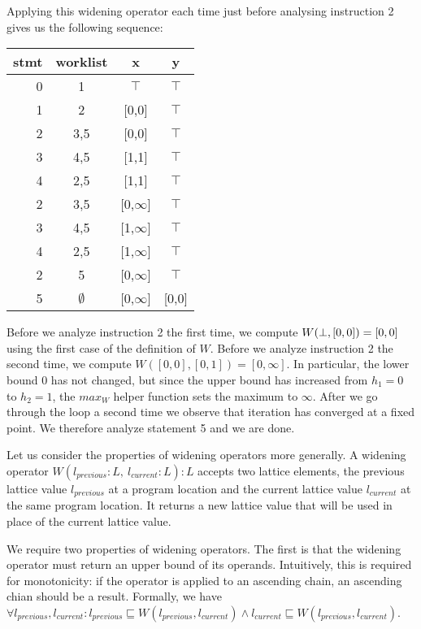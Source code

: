 \documentclass[11pt]{article}
\def\tablespace{\vspace{2ex}}
\newcommand{\alap}{\sqsubseteq}
\begin{document}
\begin{sloppypar}
Applying this widening operator each time just before analysing instruction 2 gives us the following sequence:

\tablespace
\begin{tabular}{r | c | c c}

stmt & worklist & x & y \\
\hline
0  & 1   & $\top$ & $\top$ \\
1  & 2   & [0,0] & $\top$ \\
2  & 3,5 & [0,0] & $\top$ \\
3  & 4,5 & [1,1] & $\top$ \\
4  & 2,5 & [1,1] & $\top$ \\
2  & 3,5 & [0,$\infty$] & $\top$ \\
3  & 4,5 & [1,$\infty$] & $\top$ \\
4  & 2,5 & [1,$\infty$] & $\top$ \\
2  & 5 & [0,$\infty$] & $\top$ \\
5  & $\emptyset$ & [0,$\infty$] & [0,0] \\
\end{tabular}
\tablespace

Before we analyze instruction 2 the first time, we compute $W(\bot, [0,0]) = [0,0]$ using the first case of the definition of $W$.  Before we analyze instruction 2 the second time, we compute $W([0,0], [0,1]) = [0,\infty]$.  In particular, the lower bound $0$ has not changed, but since the upper bound has increased from $h_1=0$ to $h_2=1$, the $max_W$ helper function sets the maximum to $\infty$.  After we go through the loop a second time we observe that iteration has converged at a fixed point.  We therefore analyze statement 5 and we are done.

Let us consider the properties of widening operators more generally.  A widening operator $W(l_\textit{previous} {:} L,~ l_\textit{current} {:} L) : L$ accepts two lattice elements, the previous lattice value $l_\textit{previous}$ at a program location and the current lattice value $l_\textit{current}$ at the same program location.  It returns a new lattice value that will be used in place of the current lattice value.

We require two properties of widening operators.  The first is that the widening operator must return an upper bound of its operands.  Intuitively, this is required for monotonicity: if the operator is applied to an ascending chain, an ascending chian should be a result.  Formally, we have $\forall l_\textit{previous}, l_\textit{current} : l_\textit{previous} \alap W(l_\textit{previous}, l_\textit{current}) \land l_\textit{current} \alap W(l_\textit{previous}, l_\textit{current})$.


\end{sloppypar}
\end{document}
